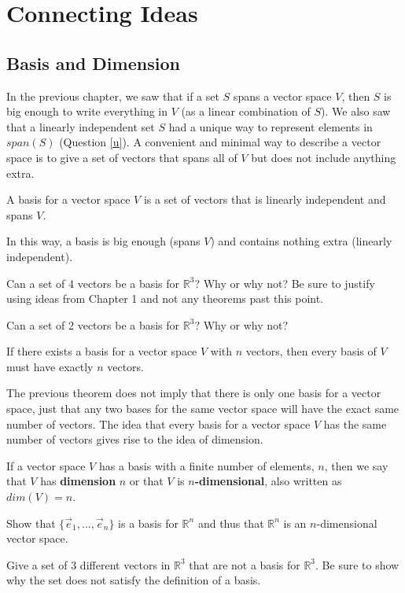 \chapter{Connecting Ideas}

\section{Basis and Dimension}
In the previous chapter, we saw that if a set $S$ spans a vector space $V$, then $S$ is big enough to write everything in $V$ (as a linear combination of $S$). We also saw that a linearly independent set $S$ had a unique way to represent elements in $span(S)$ (Question \ref{u}). A convenient and minimal way to describe a vector space is to give a set of vectors that spans all of $V$ but does not include anything extra.
\begin{definition} A basis for a vector space $V$ is a set of vectors that is linearly independent and spans $V$.
\end{definition}
In this way, a basis is big enough (spans $V$) and contains nothing extra (linearly independent).

\bq Can a set of 4 vectors be a basis for $\mathbb{R}^3$? Why or why not? Be sure to justify using ideas from Chapter 1 and not any theorems past this point.
\eq

\bq Can a set of 2 vectors be a basis for $\mathbb{R}^3$? Why or why not?
\eq

\begin{theorem}
If there exists a basis for a vector space $V$ with $n$ vectors, then every basis of $V$ must have exactly $n$ vectors.
\end{theorem}
The previous theorem does not imply that there is only one basis for a vector space, just that any two bases for the same vector space will have the exact same number of vectors. The idea that every basis for a vector space $V$ has the same number of vectors gives rise to the idea of dimension.
\begin{definition} If a vector space $V$ has a basis with a finite number of elements, $n$, then we say that $V$ has \textbf{dimension} $n$ or that $V$ is \textbf{$n$-dimensional}, also written as $dim(V)=n$. \end{definition}

\bq Show that $\{ \vec{e}_1, ... ,\vec{e}_n \}$ is a basis for $\mathbb{R}^n$ and thus that $\mathbb{R}^n$ is an $n$-dimensional vector space.
\eq

\bq Give a set of 3 different vectors in $\mathbb{R}^3$ that are not a basis for $\mathbb{R}^3$. Be sure to show why the set does not satisfy the definition of a basis.
\eq

